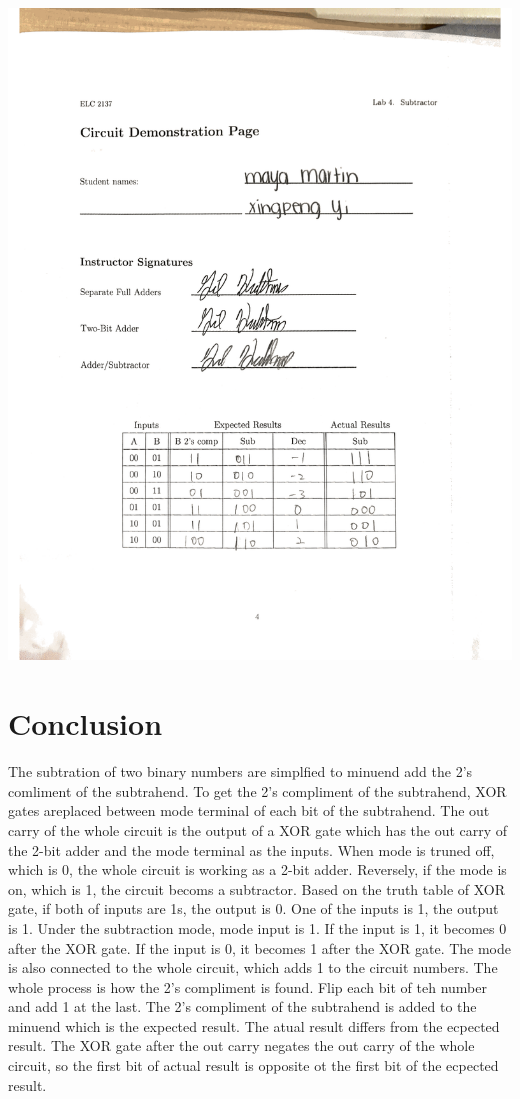 \documentclass[11pt]{article}
\begin{document}
\includegraphics[width=\textwidth]{"circuit page"}
\label{fig:Circuit demonstration page}	


\section*{Conclusion}
The subtration of two binary numbers are simplfied to minuend add the 2's comliment of the subtrahend. To get the 2's compliment of the subtrahend, XOR  gates areplaced between mode terminal  of each bit of the subtrahend. The out carry of the whole circuit is the output of a XOR gate which has the out carry of the 2-bit adder and the mode terminal as the inputs. When mode is truned off, which is 0, the whole circuit is working as a 2-bit adder. Reversely, if the mode is on, which is 1, the circuit becoms a subtractor. Based on the truth table of XOR gate, if both of inputs are 1s, the output is 0. One of the inputs is 1, the  output is 1. Under the subtraction mode, mode input is 1. If the input is 1, it becomes 0 after the XOR gate. If the input is 0, it becomes 1 after the XOR gate. The mode is also connected to the whole circuit, which adds 1 to the circuit numbers. The whole process is how the 2's compliment is found. Flip each bit of teh number and add 1 at the last. The 2's compliment of the subtrahend is added to the minuend which is the expected result. The atual result differs from the ecpected result. The XOR gate after the out carry negates the out carry of the whole circuit, so the first bit of actual result is opposite ot the first bit of the ecpected result.
\end{document}
